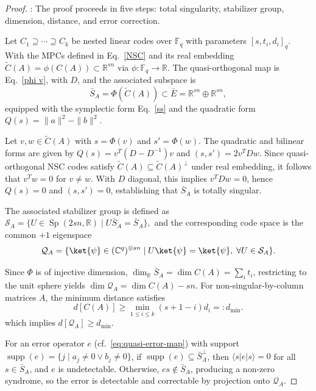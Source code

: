 \documentclass{iopjournal}
\theoremstyle{thmstyleone}%
\theoremstyle{thmstyletwo}%
\theoremstyle{thmstylethree}%
\begin{document}
\begin{proof}:
The proof proceeds in five steps: total singularity, stabilizer group, dimension,  distance, and  error correction.  

Let $C_1 \supseteq \cdots \supseteq C_k$ be nested linear codes over $\mathbb{F}_q$ with parameters 
$[s, t_i, d_i]_q$. With the MPCs defined in Eq.~\eqref{NSC}  and its real embedding 
$\tilde{C}(A) = \phi(C(A)) \subset \mathbb{R}^{sn}$ via $\phi: \mathbb{F}_q \to \mathbb{R}$.  
The quasi-orthogonal map is Eq.~\eqref{phi v}, with $D$, and the associated subspace is  
\begin{equation}
\bar{S}_A = \Phi(\tilde{C}(A)) \subset \bar{E} = \mathbb{R}^{sn} \oplus \mathbb{R}^{sn},
\end{equation}
equipped with the symplectic form Eq.~\eqref{ss} and the quadratic form $Q(s) = \|a\|^2 - \|b\|^2$.

Let $v, w \in \tilde{C}(A)$ with $s = \Phi(v)$ and $s' = \Phi(w)$. The quadratic and bilinear forms are given by $Q(s) = v^T(D - D^{-1})v$ and $(s,s') = 2v^T D w$. Since quasi-orthogonal NSC codes satisfy $\tilde{C}(A) \subseteq \tilde{C}(A)^\perp$ under real embedding, it follows that $v^T w = 0$ for $v \neq w$. With $D$ diagonal, this implies $v^T D w = 0$, hence $Q(s) = 0$ and $(s,s') = 0$, establishing that $\bar{S}_A$ is totally singular.

The associated stabilizer group is defined as 
$\mathcal{S}_A = \{ U \in \operatorname{Sp}(2sn,\mathbb{R}) \mid U\bar{S}_A = \bar{S}_A \},
$
and the corresponding code space is the common $+1$ eigenspace
\begin{equation}
\mathcal{Q}_A = \{ \ket{\psi} \in (\mathbb{C}^q)^{\otimes sn} \mid U\ket{\psi} = \ket{\psi},\; \forall U \in \mathcal{S}_A \}. \label{stab. grou}
\end{equation}

Since $\Phi$ is of injective dimension, $\dim_{\mathbb{R}}\bar{S}_A = \dim C(A) = \sum_i t_i$, restricting to the unit sphere yields $\dim \mathcal{Q}_A = \dim C(A) - sn$. For non-singular-by-column matrices $A$, the minimum distance satisfies
\begin{equation}
d[C(A)] \ge \min_{1 \le i \le k} (s+1-i)d_i =: d_{\min}.\label{min d}
\end{equation}
which implies $d[\mathcal{Q}_A] \ge d_{\min}$.

For an error operator $e$ (cf.~\eqref{eq:quasi-error-map}) with support $\operatorname{supp}(e) = \{ j \mid a_j \neq 0 \lor b_j \neq 0 \}$, if $\operatorname{supp}(e) \subseteq \bar{S}_A^\perp$, then $\langle s | e | s \rangle = 0$ for all $s \in \bar{S}_A$, and $e$ is undetectable. Otherwise, $es \notin \bar{S}_A$, producing a non-zero syndrome, so the error is detectable and correctable by projection onto $\mathcal{Q}_A$.


\end{proof}
\end{document}
